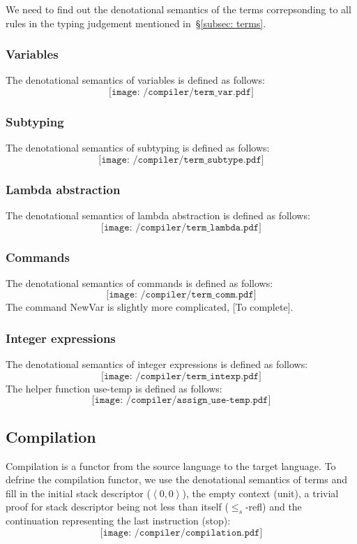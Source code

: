 \documentclass[12pt,twoside,a4paper]{report}
\theoremstyle{definition}
\theoremstyle{definition}
\theoremstyle{definition}
\theoremstyle{definition}
\newcommand{\secref}[1]{\S\ref{#1}}
\newcommand{\ang}[1]{\left\langle #1 \right\rangle}
\begin{document}
    We need to find out the denotational semantics of the terms correpsonding to all rules in the typing judgement mentioned in~\secref{subsec: terms}. 

        \subsubsection{Variables}
        The denotational semantics of variables is defined as follows:
        \[\texttt{[image: /compiler/term\_var.pdf]}\]

        \subsubsection{Subtyping}
        The denotational semantics of subtyping is defined as follows:
        \[\texttt{[image: /compiler/term\_subtype.pdf]}\]

        \subsubsection{Lambda abstraction}
        The denotational semantics of lambda abstraction is defined as follows:
        \[\texttt{[image: /compiler/term\_lambda.pdf]}\]

        \subsubsection{Commands}
        The denotational semantics of commands is defined as follows:
        \[\texttt{[image: /compiler/term\_comm.pdf]}\]
        The command \textsf{NewVar} is slightly more complicated, [To complete].

        \subsubsection{Integer expressions}
        The denotational semantics of integer expressions is defined as follows:
        \[\texttt{[image: /compiler/term\_intexp.pdf]}\]
        The helper function \textsf{use-temp} is defined as follows:
        \[\texttt{[image: /compiler/assign\_use-temp.pdf]}\]

    \subsection{Compilation} \label{subsec: compilation}
    Compilation is a functor from the source language to the target language. To defrine the compilation functor, we use the denotational semantics of terms and fill in the initial stack descriptor ($\ang{0, 0}$), the empty context (\textsf{unit}), a trivial proof for stack descriptor being not less than itself (\textsf{$\leq_s$-refl}) and the continuation representing the last instruction (\textsf{stop}):
    \[\texttt{[image: /compiler/compilation.pdf]}\]
\end{document}

